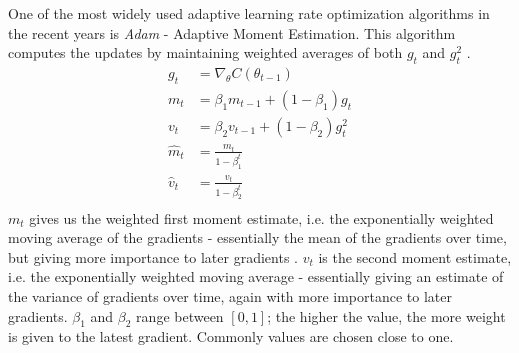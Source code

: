 
One of the most widely used adaptive learning rate optimization algorithms in the recent years is \textit{Adam} - Adaptive Moment Estimation.
This algorithm computes the updates by maintaining weighted averages of both $g_t$ and $g_t^2$ \citep[p. 123]{Ketkar2017}. 
\begin{equation}\label{eq:updt_adam}
\begin{split}
    g_t &= \nabla_{\theta}C(\theta_{t-1})   \\
    m_t &= \beta_1m_{t-1} + (1-\beta_1)g_t \\
    v_t &= \beta_2v_{t-1} + (1-\beta_2)g_t^2 \\
    \hat{m}_t &= \frac{m_t}{1-\beta_1^t} \\
    \hat{v}_t &= \frac{v_t}{1-\beta_2^t} \\
\end{split}
\end{equation}
$m_t$ gives us the weighted first moment estimate, i.e. the exponentially weighted moving average of the gradients - essentially the mean of the gradients over time, but giving more importance to later gradients \cite{kingba}. $v_t$ is the second moment estimate, i.e. the exponentially weighted moving average - essentially giving an estimate of the variance of gradients over time, again with more importance to later gradients. $\beta_1$ and $\beta_2$ range between $[0,1]$; the higher the value, the more weight is given to the latest gradient. Commonly values are chosen close to one. 

